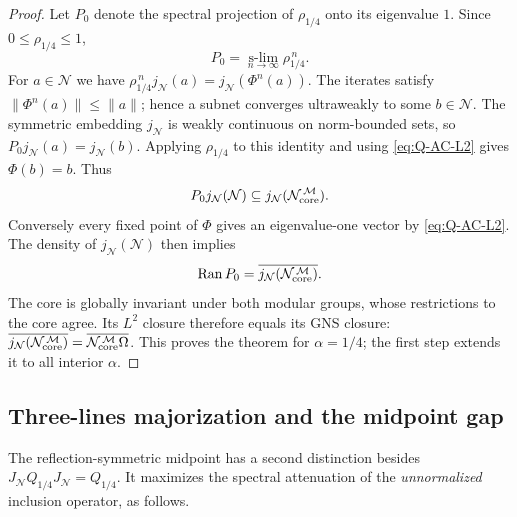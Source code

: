 \documentclass[a4paper,11pt]{article}
\theoremstyle{definition}
\newcommand{\mN}{\mathcal{N}}
\newcommand{\mM}{\mathcal{M}}
\begin{document}
\begin{proof}
Let $P_0$ denote the spectral projection of $\rho_{1/4}$
onto its eigenvalue $1$. Since $0\leq\rho_{1/4}\leq1$,
\begin{equation}
 P_0=\operatorname*{s-lim}_{n\to\infty}\rho_{1/4}^{\,n}.
\end{equation}
For $a\in\mN$ we have
$\rho_{1/4}^{\,n}j_\mN(a)=j_\mN(\Phi^n(a))$.
The iterates satisfy $\|\Phi^n(a)\|\leq\|a\|$; hence a subnet
converges ultraweakly to some $b\in\mN$. The symmetric embedding
$j_\mN$ is weakly continuous on norm-bounded sets, so
$P_0j_\mN(a)=j_\mN(b)$. Applying $\rho_{1/4}$ to this identity
and using \eqref{eq:Q-AC-L2} gives $\Phi(b)=b$. Thus
\begin{equation}
 P_0j_\mN(\mN)\subseteq
 j_\mN(\mN_{\rm core}^{\,\mM}).
\end{equation}
Conversely every fixed point of $\Phi$ gives an eigenvalue-one
vector by \eqref{eq:Q-AC-L2}. The density of $j_\mN(\mN)$
then implies
\begin{equation}
 \operatorname{Ran}P_0
 =\overline{j_\mN(\mN_{\rm core}^{\,\mM})}.
\end{equation}
The core is globally invariant under both modular groups, whose
restrictions to the core agree. Its $L^2$ closure therefore equals
its GNS closure:
$\overline{j_\mN(\mN_{\rm core}^{\,\mM})}
 =\overline{\mN_{\rm core}^{\,\mM}\Omega}$.
This proves the theorem for $\alpha=1/4$; the first step
extends it to all interior $\alpha$.
\end{proof}

\subsection{Three-lines majorization and the midpoint gap}
\label{subsec:Q-three-lines}

The reflection-symmetric midpoint has a second distinction besides
$J_\mN Q_{1/4}J_\mN=Q_{1/4}$. It maximizes the spectral
attenuation of the \emph{unnormalized} inclusion operator, as follows.
\end{document}

